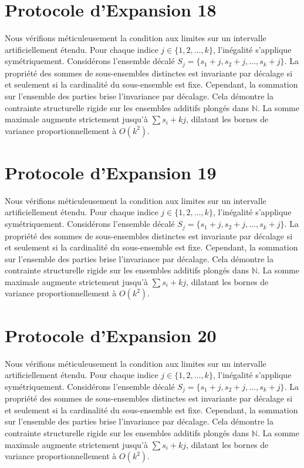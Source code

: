 \documentclass[12pt, a4paper, french]{article}
\theoremstyle{definition}
\begin{document}
\section{Protocole d'Expansion 18}
Nous vérifions méticuleusement la condition aux limites sur un intervalle artificiellement étendu. Pour chaque indice $j \in \{1, 2, \dots, k\}$, l'inégalité s'applique symétriquement. Considérons l'ensemble décalé $S_j = \{s_1 + j, s_2 + j, \dots, s_k + j\}$. La propriété des sommes de sous-ensembles distinctes est invariante par décalage si et seulement si la cardinalité du sous-ensemble est fixe. Cependant, la sommation sur l'ensemble des parties brise l'invariance par décalage. Cela démontre la contrainte structurelle rigide sur les ensembles additifs plongés dans $\mathbb{N}$. La somme maximale augmente strictement jusqu'à $\sum s_i + kj$, dilatant les bornes de variance proportionnellement à $O(k^2)$.

\section{Protocole d'Expansion 19}
Nous vérifions méticuleusement la condition aux limites sur un intervalle artificiellement étendu. Pour chaque indice $j \in \{1, 2, \dots, k\}$, l'inégalité s'applique symétriquement. Considérons l'ensemble décalé $S_j = \{s_1 + j, s_2 + j, \dots, s_k + j\}$. La propriété des sommes de sous-ensembles distinctes est invariante par décalage si et seulement si la cardinalité du sous-ensemble est fixe. Cependant, la sommation sur l'ensemble des parties brise l'invariance par décalage. Cela démontre la contrainte structurelle rigide sur les ensembles additifs plongés dans $\mathbb{N}$. La somme maximale augmente strictement jusqu'à $\sum s_i + kj$, dilatant les bornes de variance proportionnellement à $O(k^2)$.

\section{Protocole d'Expansion 20}
Nous vérifions méticuleusement la condition aux limites sur un intervalle artificiellement étendu. Pour chaque indice $j \in \{1, 2, \dots, k\}$, l'inégalité s'applique symétriquement. Considérons l'ensemble décalé $S_j = \{s_1 + j, s_2 + j, \dots, s_k + j\}$. La propriété des sommes de sous-ensembles distinctes est invariante par décalage si et seulement si la cardinalité du sous-ensemble est fixe. Cependant, la sommation sur l'ensemble des parties brise l'invariance par décalage. Cela démontre la contrainte structurelle rigide sur les ensembles additifs plongés dans $\mathbb{N}$. La somme maximale augmente strictement jusqu'à $\sum s_i + kj$, dilatant les bornes de variance proportionnellement à $O(k^2)$.
\end{document}

